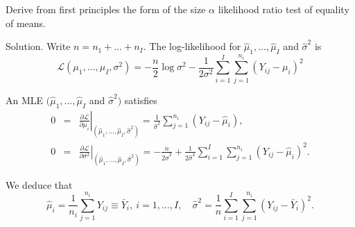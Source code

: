 Derive from first principles the form of the size $\alpha$ likelihood ratio test of equality of means.



Solution. Write $n=n_1+\dots+n_I$. The log-likelihood for $\hat{\mu}_1,\dots,\hat{\mu}_I$ and $\hat{\sigma}^2$ is
\begin{equation}
\mathcal{L}(\mu_1,\dots,\mu_I,\sigma^2) = -\frac{n}{2}\log\sigma^2 - \frac{1}{2\sigma^2}\sum^I_{i=1}\sum^{n_i}_{j=1}(Y_{ij}-\mu_i)^2
\end{equation}

An MLE $(\hat{\mu}_1,\dots,\hat{\mu}_I$ and $\hat{\sigma}^2)$ satisfies
\begin{eqnarray}
0 & = & \left.\frac{\partial\mathcal{L}}{\partial \mu_i}\right|_{\left(\hat{\mu}_1,\dots,\hat{\mu}_I, \hat{\sigma}^2\right)} = \frac{1}{\hat{\sigma}^2}\sum^{n_i}_{j=1}(Y_{ij}-\hat{\mu}_i), \nonumber\\
0 & = & \left.\frac{\partial\mathcal{L}}{\partial\sigma^2}\right|_{\left(\hat{\mu}_1,\dots,\hat{\mu}_I, \hat{\sigma}^2\right)} = -\frac{n}{2\hat{\sigma}^2} + \frac{1}{2\hat{\sigma}^4}\sum^I_{i=1}\sum^{n_i}_{j=1}(Y_{ij}-\hat{\mu}_i)^2.
\end{eqnarray}

We deduce that
\begin{equation}
\hat{\mu}_i = \frac{1}{n_i}\sum^{n_i}_{j=1}Y_{ij} \equiv \bar{Y}_i, \ i=1,\dots,I,\quad \hat{\sigma}^2 = \frac{1}{n}\sum^I_{i=1}\sum^{n_i}_{j=1}\left(Y_{ij} -\bar{Y}_i\right)^2.
\end{equation}

